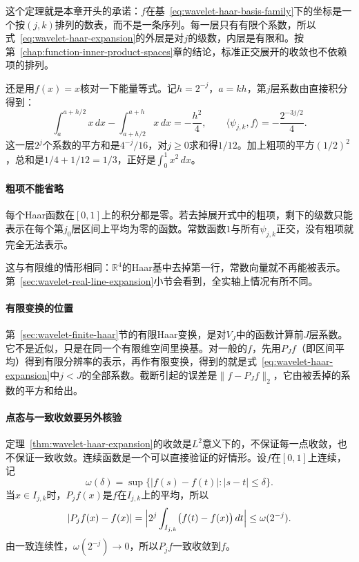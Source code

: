 这个定理就是本章开头的承诺：$f$在基~\eqref{eq:wavelet-haar-basis-family}下的坐标是一个按$(j,k)$排列的数表，而不是一条序列。每一层只有有限个系数，所以式~\eqref{eq:wavelet-haar-expansion}的外层是对$j$的级数，内层是有限和。按第~\ref{chap:function-inner-product-spaces}章的结论，标准正交展开的收敛也不依赖项的排列。

还是用$f(x)=x$核对一下能量等式。记$h=2^{-j}$，$a=kh$，第$j$层系数由直接积分得到：
\[
 \int_a^{a+h/2}x\,dx-\int_{a+h/2}^{a+h}x\,dx=-\frac{h^2}4,\qquad
 \langle\psi_{j,k},f\rangle=-\frac{2^{-3j/2}}4.
\]
这一层$2^j$个系数的平方和是$4^{-j}/16$，对$j\geq0$求和得$1/12$。加上粗项的平方$(1/2)^2$，总和是$1/4+1/12=1/3$，正好是$\int_0^1x^2\,dx$。

\paragraph{粗项不能省略}
每个Haar函数在$[0,1]$上的积分都是零。若去掉展开式中的粗项，剩下的级数只能表示在每个第$j_0$层区间上平均为零的函数。常数函数$1$与所有$\psi_{j,k}$正交，没有粗项就完全无法表示。

这与有限维的情形相同：$\mathbb R^4$的Haar基中去掉第一行，常数向量就不再能被表示。第~\ref{sec:wavelet-real-line-expansion}小节会看到，全实轴上情况有所不同。

\paragraph{有限变换的位置}
第~\ref{sec:wavelet-finite-haar}节的有限Haar变换，是对$V_J$中的函数计算前$J$层系数。它不是近似，只是在同一个有限维空间里换基。对一般的$f$，先用$P_Jf$（即区间平均）得到有限分辨率的表示，再作有限变换，得到的就是式~\eqref{eq:wavelet-haar-expansion}中$j<J$的全部系数。截断引起的误差是$\lVert f-P_Jf\rVert_2$，它由被丢掉的系数的平方和给出。

\paragraph{点态与一致收敛要另外核验}
定理~\ref{thm:wavelet-haar-expansion}的收敛是$L^2$意义下的，不保证每一点收敛，也不保证一致收敛。连续函数是一个可以直接验证的好情形。设$f$在$[0,1]$上连续，记
\[
 \omega(\delta)=\sup\{\lvert f(s)-f(t)\rvert:\lvert s-t\rvert\leq\delta\}.
\]
当$x\in I_{j,k}$时，$P_jf(x)$是$f$在$I_{j,k}$上的平均，所以
\[
 \lvert P_jf(x)-f(x)\rvert=\Bigl\lvert2^j\int_{I_{j,k}}\bigl(f(t)-f(x)\bigr)\,dt\Bigr\rvert\leq\omega(2^{-j}).
\]
由一致连续性，$\omega(2^{-j})\to0$，所以$P_jf$一致收敛到$f$。

